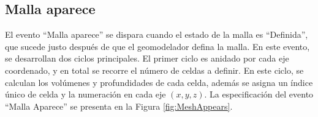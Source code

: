 
\subsection{Malla aparece}\label{subsec:PS_MeshAppears}
El evento ``Malla aparece'' se dispara cuando el estado de la malla es ``Definida'', que sucede justo después de que el geomodelador defina la malla. En este evento, se desarrollan dos ciclos principales. El primer ciclo es anidado por cada eje coordenado, y en total se recorre el número de celdas a definir. En este ciclo, se calculan los volúmenes y profundidades de cada celda, además se asigna un índice único de celda y la numeración en cada eje $(x,y,z)$. La especificación del evento ``Malla Aparece'' se presenta en la Figura \ref{fig:MeshAppears}.\\

